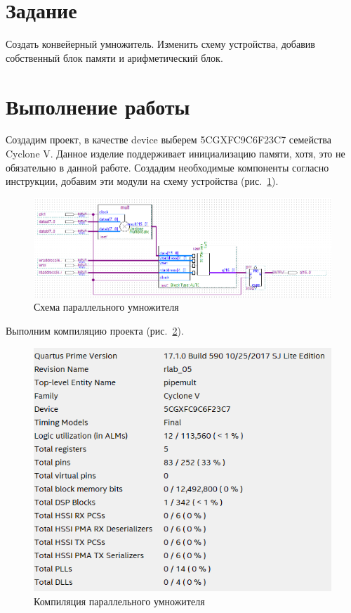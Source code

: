 \documentclass[a4paper,14pt]{article}
\begin{document}

\tableofcontents
\pagebreak

\section{Задание}

Создать конвейерный умножитель.
Изменить схему устройства, добавив собственный блок памяти и арифметический блок.

\section{Выполнение работы}

Создадим проект, в качестве device выберем 5CGXFC9C6F23C7 семейства Cyclone V.
Данное изделие поддерживает инициализацию памяти, хотя, это не обязательно в данной работе.
Создадим необходимые компоненты согласно инструкции, добавим эти модули на схему устройства (рис.~\ref{fig:z1_schema}).

\begin{figure}[H]
	\centering
	\includegraphics[width=\linewidth]{image/z1_schema}
	\caption{Схема параллельного умножителя}
	\label{fig:z1_schema}
\end{figure}

Выполним компиляцию проекта (рис.~\ref{fig:z1_report}).

\begin{figure}[H]
	\centering
	\includegraphics[width=0.5\linewidth]{image/z1_report}
	\caption{Компиляция параллельного умножителя}
	\label{fig:z1_report}
\end{figure}
\end{document}
